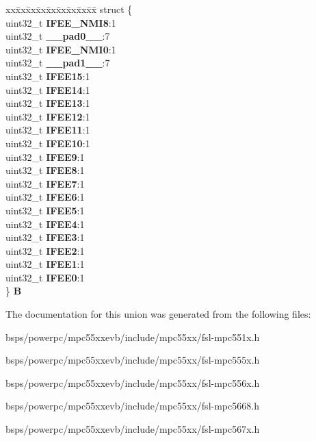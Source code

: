 \begin{DoxyCompactItemize}
\begin{tabbing}
\end{tabbing}\item 
\mbox{\label{unionSIU__tag_1_1SIU__IFEER__tag_a1a119c4a763def2b4f9d6a8de1f4e7c0}} 
\begin{tabbing}
xx\=xx\=xx\=xx\=xx\=xx\=xx\=xx\=xx\=\kill
struct \{\\
\>uint32\_t {\bfseries IFEE\_NMI8}:1\\
\>uint32\_t {\bfseries \_\_pad0\_\_}:7\\
\>uint32\_t {\bfseries IFEE\_NMI0}:1\\
\>uint32\_t {\bfseries \_\_pad1\_\_}:7\\
\>uint32\_t {\bfseries IFEE15}:1\\
\>uint32\_t {\bfseries IFEE14}:1\\
\>uint32\_t {\bfseries IFEE13}:1\\
\>uint32\_t {\bfseries IFEE12}:1\\
\>uint32\_t {\bfseries IFEE11}:1\\
\>uint32\_t {\bfseries IFEE10}:1\\
\>uint32\_t {\bfseries IFEE9}:1\\
\>uint32\_t {\bfseries IFEE8}:1\\
\>uint32\_t {\bfseries IFEE7}:1\\
\>uint32\_t {\bfseries IFEE6}:1\\
\>uint32\_t {\bfseries IFEE5}:1\\
\>uint32\_t {\bfseries IFEE4}:1\\
\>uint32\_t {\bfseries IFEE3}:1\\
\>uint32\_t {\bfseries IFEE2}:1\\
\>uint32\_t {\bfseries IFEE1}:1\\
\>uint32\_t {\bfseries IFEE0}:1\\
\} {\bfseries B}\\

\end{tabbing}\end{DoxyCompactItemize}


The documentation for this union was generated from the following files\+:\begin{DoxyCompactItemize}
\item 
bsps/powerpc/mpc55xxevb/include/mpc55xx/fsl-\/mpc551x.\+h\item 
bsps/powerpc/mpc55xxevb/include/mpc55xx/fsl-\/mpc555x.\+h\item 
bsps/powerpc/mpc55xxevb/include/mpc55xx/fsl-\/mpc556x.\+h\item 
bsps/powerpc/mpc55xxevb/include/mpc55xx/fsl-\/mpc5668.\+h\item 
bsps/powerpc/mpc55xxevb/include/mpc55xx/fsl-\/mpc567x.\+h\end{DoxyCompactItemize}
